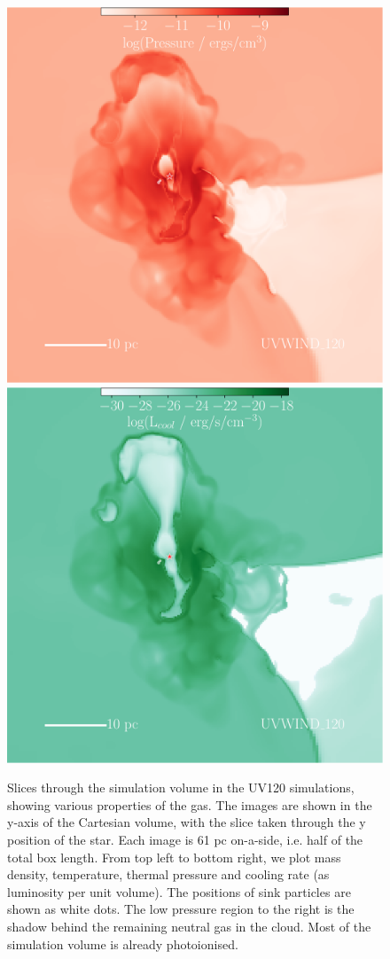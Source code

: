 \documentclass[a4paper,fleqn,usenatbib]{mnras}
\begin{document}
\begin{figure}
	\centerline{\includegraphics[width=0.80\columnwidth]{plots/fig4c.pdf}
	\includegraphics[width=0.80\columnwidth]{plots/fig4d.pdf}}
	\caption{Slices through the simulation volume in the UV120 simulations, showing various properties of the gas. The images are shown in the y-axis of the Cartesian volume, with the slice taken through the y position of the star. Each image is 61 pc on-a-side, i.e. half of the total box length. From top left to bottom right, we plot mass density, temperature, thermal pressure and cooling rate (as luminosity per unit volume). The positions of sink particles are shown as white dots. The low pressure region to the right is the shadow behind the remaining neutral gas in the cloud. Most of the simulation volume is already photoionised.}
	\label{fig:windslices}
\end{figure}
\end{document}
